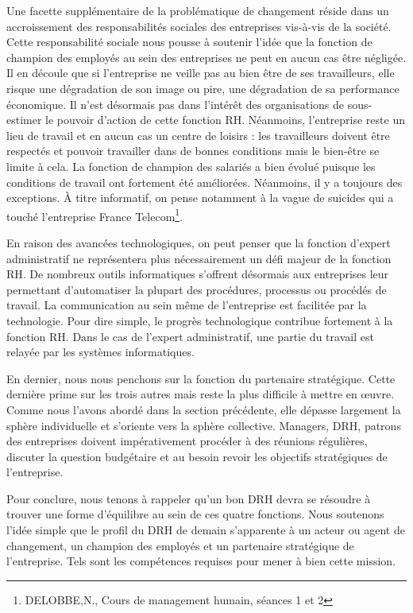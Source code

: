 \documentclass[a4paper, 12pt]{article}
\begin{document}
Une facette supplémentaire de la problématique de changement réside dans un accroissement des responsabilités sociales des entreprises vis-à-vis de la société. Cette responsabilité sociale nous pousse à soutenir l'idée que la fonction de champion des employés au sein des entreprises ne peut en aucun cas être négligée. Il en découle que si l'entreprise ne veille pas au bien être de ses travailleurs, elle risque une dégradation de son image ou pire, une dégradation de sa performance économique. Il n'est désormais pas dans l'intérêt des organisations de sous-estimer le pouvoir d'action de cette fonction RH. Néanmoins, l'entreprise reste un lieu de travail et en aucun cas un centre de loisirs : les travailleurs doivent être respectés et pouvoir travailler dans de bonnes conditions mais le bien-être se limite à cela. La fonction de champion des salariés a bien évolué puisque les conditions de travail ont fortement été améliorées. Néanmoins, il y a toujours des exceptions. À titre informatif, on pense notamment à la vague de suicides qui a touché l'entreprise France Telecom\footnote{DELOBBE,N., Cours de management humain, séances 1 et 2}.

En raison des avancées technologiques, on peut penser que la fonction d'expert administratif ne représentera plus nécessairement un défi majeur de la fonction RH. De nombreux outils informatiques s'offrent désormais aux entreprises leur permettant d'automatiser la plupart des procédures, processus ou procédés de travail. La communication au sein même de l'entreprise est facilitée par la technologie. Pour dire simple, le progrès technologique contribue fortement à la fonction RH. Dans le cas de l'expert administratif, une partie du travail est relayée par les systèmes informatiques.

En dernier, nous nous penchons sur la fonction du partenaire stratégique. Cette dernière prime sur les trois autres mais reste la plus difficile à mettre en œuvre. Comme nous l'avons abordé dans la section précédente, elle dépasse largement la sphère individuelle et s'oriente vers la sphère collective. Managers, DRH, patrons des entreprises doivent impérativement procéder à des réunions régulières, discuter la question budgétaire et au besoin revoir les objectifs stratégiques de l'entreprise. 

Pour conclure, nous tenons à rappeler qu'un bon DRH devra se résoudre à trouver une forme d'équilibre au sein de ces quatre fonctions. Nous soutenons l'idée simple que le profil du DRH de demain s'apparente à un acteur ou agent de changement, un champion des employés et un partenaire stratégique de l'entreprise. Tels sont les compétences requises pour mener à bien cette mission. 
\end{document}
